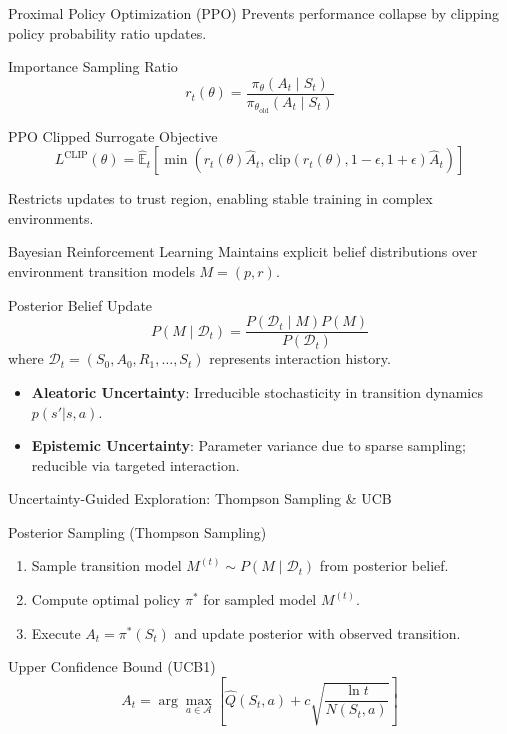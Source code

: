 \documentclass[10pt, aspectratio=169]{beamer}
\begin{document}
\begin{frame}{Proximal Policy Optimization (PPO)}
  Prevents performance collapse by clipping policy probability ratio updates.

  \begin{block}{Importance Sampling Ratio}
    $$r_t(\theta) = \frac{\pi_\theta(A_t \mid S_t)}{\pi_{\theta_{\text{old}}}(A_t \mid S_t)}$$
  \end{block}

  \begin{block}{PPO Clipped Surrogate Objective}
    $$L^{\text{CLIP}}(\theta) = \hat{\mathbb{E}}_t \left[ \min \left( r_t(\theta) \hat{A}_t, \, \text{clip}(r_t(\theta), 1-\epsilon, 1+\epsilon) \hat{A}_t \right) \right]$$
  \end{block}
  Restricts updates to trust region, enabling stable training in complex environments.
\end{frame}

\begin{frame}{Bayesian Reinforcement Learning}
  Maintains explicit belief distributions over environment transition models $M = (p, r)$.

  \begin{block}{Posterior Belief Update}
    $$P(M \mid \mathcal{D}_t) = \frac{P(\mathcal{D}_t \mid M) P(M)}{P(\mathcal{D}_t)}$$
    where $\mathcal{D}_t = (S_0, A_0, R_1, \dots, S_t)$ represents interaction history.
  \end{block}

  \begin{itemize}
    \item \textbf{Aleatoric Uncertainty}: Irreducible stochasticity in transition dynamics $p(s'|s,a)$.
    \item \textbf{Epistemic Uncertainty}: Parameter variance due to sparse sampling; reducible via targeted interaction.
  \end{itemize}
\end{frame}

\begin{frame}{Uncertainty-Guided Exploration: Thompson Sampling \& UCB}
  \begin{block}{Posterior Sampling (Thompson Sampling)}
    \begin{enumerate}
      \item Sample transition model $M^{(t)} \sim P(M \mid \mathcal{D}_t)$ from posterior belief.
      \item Compute optimal policy $\pi^*$ for sampled model $M^{(t)}$.
      \item Execute $A_t = \pi^*(S_t)$ and update posterior with observed transition.
    \end{enumerate}
  \end{block}

  \begin{block}{Upper Confidence Bound (UCB1)}
    $$A_t = \arg\max_{a \in \mathcal{A}} \left[ \hat{Q}(S_t, a) + c \sqrt{\frac{\ln t}{N(S_t, a)}} \right]$$
  \end{block}
\end{frame}
\end{document}
